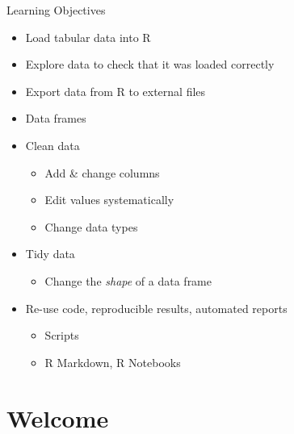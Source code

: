 \documentclass[
  11pt,
  ignorenonframetext,
]{beamer}
\providecommand{\tightlist}{%
  \setlength{\itemsep}{0pt}\setlength{\parskip}{0pt}}
\begin{document}
\begin{frame}{Learning Objectives}
\protect\hypertarget{learning-objectives}{}
\begin{itemize}
\tightlist
\item
  Load tabular data into R
\item
  Explore data to check that it was loaded correctly
\item
  Export data from R to external files
\item
  Data frames
\item
  Clean data

  \begin{itemize}
  \tightlist
  \item
    Add \& change columns
  \item
    Edit values systematically
  \item
    Change data types
  \end{itemize}
\item
  Tidy data

  \begin{itemize}
  \tightlist
  \item
    Change the \emph{shape} of a data frame
  \end{itemize}
\item
  Re-use code, reproducible results, automated reports

  \begin{itemize}
  \tightlist
  \item
    Scripts
  \item
    R Markdown, R Notebooks
  \end{itemize}
\end{itemize}
\end{frame}

\hypertarget{welcome}{%
\section{Welcome}\label{welcome}}
\end{document}
